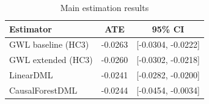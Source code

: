 \begin{table}[htbp]
\centering
\caption{Main estimation results}
\label{tab:main_results}
\begin{tabular}{lcc}
\toprule
Estimator & ATE & 95\% CI \\
\midrule
GWL baseline (HC3) & -0.0263 & [-0.0304, -0.0222] \\
GWL extended (HC3) & -0.0260 & [-0.0302, -0.0218] \\
LinearDML & -0.0241 & [-0.0282, -0.0200] \\
CausalForestDML & -0.0244 & [-0.0454, -0.0034] \\
\bottomrule
\end{tabular}
\end{table}
